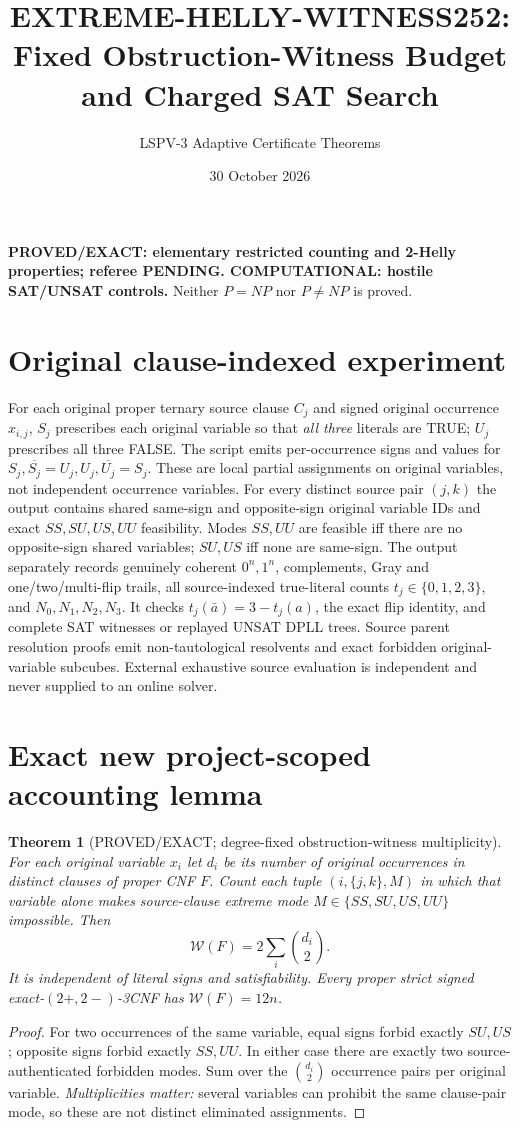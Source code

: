 \documentclass[11pt]{article}
\title{EXTREME-HELLY-WITNESS252: Fixed Obstruction-Witness Budget and Charged SAT Search}
\author{LSPV-3 Adaptive Certificate Theorems}
\date{30 October 2026}
\newtheorem{theorem}{Theorem}
\begin{document}
\maketitle
\noindent\textbf{PROVED/EXACT: elementary restricted counting and 2-Helly properties; referee PENDING. COMPUTATIONAL: hostile SAT/UNSAT controls.} Neither $P=NP$ nor $P\ne NP$ is proved.

\section{Original clause-indexed experiment}
For each original proper ternary source clause $C_j$ and signed original occurrence $x_{i,j}$, $S_j$ prescribes each original variable so that \emph{all three} literals are TRUE; $U_j$ prescribes all three FALSE. The script emits per-occurrence signs and values for $S_j,\overline{S_j}=U_j,U_j,\overline{U_j}=S_j$. These are local partial assignments on original variables, not independent occurrence variables. For every distinct source pair $(j,k)$ the output contains shared same-sign and opposite-sign original variable IDs and exact $SS,SU,US,UU$ feasibility. Modes $SS,UU$ are feasible iff there are no opposite-sign shared variables; $SU,US$ iff none are same-sign. The output separately records genuinely coherent $0^n,1^n$, complements, Gray and one/two/multi-flip trails, all source-indexed true-literal counts $t_j\in\{0,1,2,3\}$, and $N_0,N_1,N_2,N_3$. It checks $t_j(\bar a)=3-t_j(a)$, the exact flip identity, and complete SAT witnesses or replayed UNSAT DPLL trees. Source parent resolution proofs emit non-tautological resolvents and exact forbidden original-variable subcubes. External exhaustive source evaluation is independent and never supplied to an online solver.

\section{Exact new project-scoped accounting lemma}
\begin{theorem}[PROVED/EXACT; degree-fixed obstruction-witness multiplicity]
For each original variable $x_i$ let $d_i$ be its number of original occurrences in \emph{distinct} clauses of proper CNF $F$. Count each tuple $(i,\{j,k\},M)$ in which that variable alone makes source-clause extreme mode $M\in\{SS,SU,US,UU\}$ impossible. Then
\[
\mathcal W(F)=2\sum_i\binom{d_i}{2}.
\]
It is independent of literal signs and satisfiability. Every proper strict signed exact-$(2+,2-)$-3CNF has $\mathcal W(F)=12n$.
\end{theorem}
\begin{proof}
For two occurrences of the same variable, equal signs forbid exactly $SU,US$; opposite signs forbid exactly $SS,UU$. In either case there are exactly two source-authenticated forbidden modes. Sum over the $\binom{d_i}{2}$ occurrence pairs per original variable. \emph{Multiplicities matter:} several variables can prohibit the same clause-pair mode, so these are not distinct eliminated assignments.
\end{proof}
\end{document}
